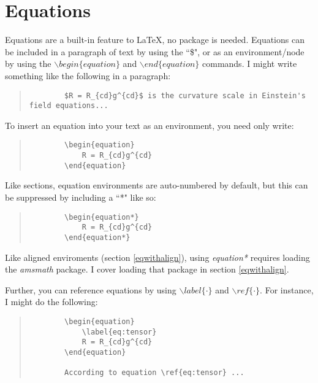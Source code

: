 \section{Equations}

Equations are a built-in feature to LaTeX, no package is needed. Equations can be included in a paragraph of text by using the ``\$", or as an environment/node by using the $\backslash begin\{equation\}$ and $\backslash end\{equation\}$ commands.  I might write something like the following in a paragraph:

\begin{quote}
	\begin{verbatim}
		$R = R_{cd}g^{cd}$ is the curvature scale in Einstein's field equations...
	\end{verbatim}
\end{quote}


To insert an equation into your text as an environment, you need only write:

\begin{quote}
	\begin{verbatim}
		\begin{equation}
			R = R_{cd}g^{cd}
		\end{equation}
	\end{verbatim}
\end{quote}

Like sections, equation environments are auto-numbered by default, but this can be suppressed by including a ``*" like so:

\begin{quote}
	\begin{verbatim}
		\begin{equation*}
			R = R_{cd}g^{cd}
		\end{equation*}
	\end{verbatim}
\end{quote}

Like aligned enviroments (section \ref{eqwithalign}), using \emph{equation*} requires loading the \emph{amsmath} package.  I cover loading that package in section \ref{eqwithalign}.

Further, you can reference equations by using $\backslash label\{\cdot\}$ and $\backslash ref\{\cdot\}$.  For instance, I might do the following:

\begin{quote}
	\begin{verbatim}
		\begin{equation}
			\label{eq:tensor}	
			R = R_{cd}g^{cd}
		\end{equation}
		
		According to equation \ref{eq:tensor} ...
	\end{verbatim}
\end{quote}

